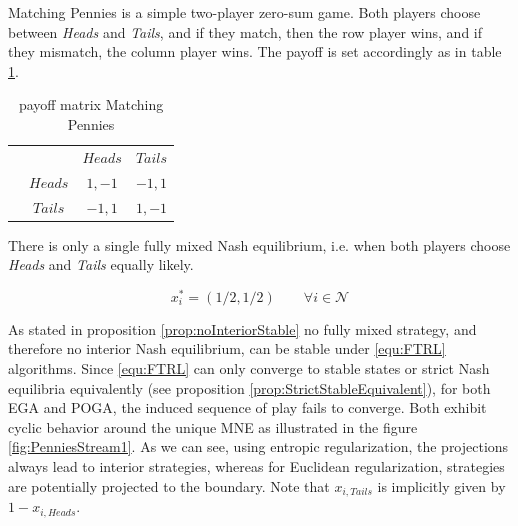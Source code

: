 Matching Pennies is a simple two-player zero-sum game. Both players choose between \textit{Heads} and \textit{Tails}, and if they match, then the row player wins, and if they mismatch, the column player wins. The payoff is set accordingly as in table \ref{tab:payoffMachtingPennies}. 

\begin{table}[H]\centering
\setlength{\extrarowheight}{2pt}
\begin{tabular}{cc|c|c|}
  & \multicolumn{1}{c}{} & \multicolumn{1}{c}{$Heads$}  & \multicolumn{1}{c}{$Tails$} \\\cline{3-4}
  & $Heads$ & $1,-1$ & $-1,1$ \\\cline{3-4}
  & $Tails$ & $-1,1$ & $1,-1$ \\\cline{3-4}
\end{tabular}\caption{\label{tab:payoffMachtingPennies}payoff matrix Matching Pennies}
\end{table}

There is only a single fully mixed Nash equilibrium, i.e. when both players choose \textit{Heads} and \textit{Tails} equally likely. 

\begin{equation*}
    x_{i}^{*} = (1/2,1/2) \qquad \forall i \in \mathcal{N}
\end{equation*}

As stated in proposition \ref{prop:noInteriorStable} no fully mixed strategy, and therefore no interior Nash equilibrium, can be stable under \ref{equ:FTRL} algorithms. Since \ref{equ:FTRL} can only converge to stable states or strict Nash equilibria equivalently (see proposition \ref{prop:StrictStableEquivalent}), for both EGA and POGA, the induced sequence of play fails to converge. Both exhibit cyclic behavior around the unique MNE as illustrated in the figure \ref{fig:PenniesStream1}. As we can see, using entropic regularization, the projections always lead to interior strategies, whereas for Euclidean regularization, strategies are potentially projected to the boundary. Note that $x_{i,Tails}$ is implicitly given by $1 - x_{i,Heads}$.

